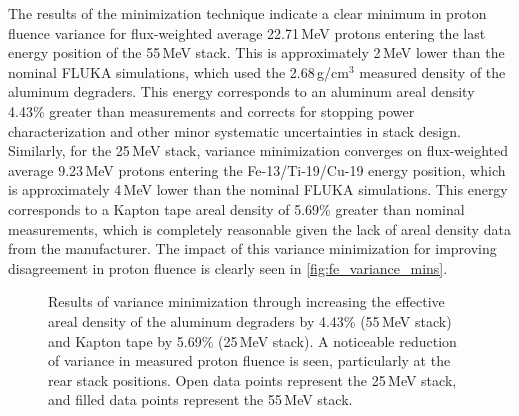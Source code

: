 The results of the minimization technique indicate a clear minimum in proton fluence variance for flux-weighted average 22.71\,MeV protons entering the last energy position of the 55\,MeV stack.
This is approximately 2\,MeV lower than the 
nominal 
FLUKA simulations,
which used the 
2.68\,g/cm$^3$ measured density of the  aluminum degraders.
This energy corresponds to an aluminum areal density  4.43\% greater than 
measurements and 
corrects for stopping power characterization and other minor systematic uncertainties in stack design.
Similarly, for the 25\,MeV stack, variance minimization converges on  flux-weighted average 9.23\,MeV protons entering the Fe-13/Ti-19/Cu-19 energy position, which is approximately 4\,MeV lower than the nominal FLUKA simulations.
This energy corresponds to a Kapton tape areal density of 5.69\% greater than nominal measurements, which is completely reasonable given the lack of areal density data from the manufacturer.
The impact of this variance minimization for improving disagreement in proton fluence is  clearly  seen in   \autoref{fig:fe_variance_mins}.




\begin{figure}
    \centering
    \caption{Results of variance minimization through increasing the effective areal density of the  aluminum degraders by 4.43\% (55\,MeV stack) and Kapton tape by 5.69\% (25\,MeV stack). A noticeable reduction of variance in measured proton fluence is seen,  particularly at the  rear stack positions.  Open data points represent the 25\,MeV stack, and filled data points represent the 55\,MeV stack.} 
     \label{fig:fe_variance_mins}
\end{figure}




